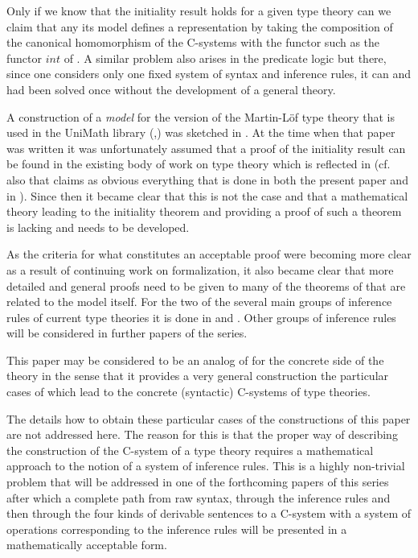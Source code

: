 \documentclass[11pt]{article}
\begin{document}
Only if we know that the initiality result holds for a given type theory can we claim that any its model defines a representation by taking the composition of the canonical homomorphism of the C-systems with the functor such as the functor $int$ of \cite{Cfromauniverse}. A similar problem also arises in the predicate logic but there, since one considers only one fixed system of syntax and inference rules, it can and had been solved once without the development of a general theory. 

A construction of a {\em model} for the version of the Martin-L\"{o}f type theory that is used in the UniMath library (\cite{UniMath},\cite{UniMath2015})  was sketched in \cite{KLV1}. At the time when that paper was written it was unfortunately assumed that a proof of the initiality result can be found in the existing body of work on type theory which is reflected  in \cite[Theorem 1.2.9]{KLV1} (cf. also \cite[Example 1.2.3]{KLV1} that claims as obvious everything that is done in both the present paper and in \cite{Csubsystems}).  Since then it became clear that this is not the case and that a mathematical theory leading to the initiality theorem and providing a proof of such a theorem is lacking and needs to be developed. 

As the criteria for what constitutes an acceptable proof were becoming more clear as a result of continuing work on formalization, it also became clear that more detailed and general proofs need to be given to many of the theorems of \cite{KLV1} that are related to the model itself. For the two of the several main groups of inference rules of current type theories it is done in \cite{fromunivwithPi} and \cite{fromunivwithpaths}. Other groups of inference rules will be considered in further papers of the series. 

This paper may be considered to be an analog of \cite{Cfromauniverse} for the concrete side of the theory in the sense that it provides a very general construction the particular cases of which lead to the concrete (syntactic) C-systems of type theories. 

The details how to obtain these particular cases of the constructions of this paper are not addressed here. The reason for this is that the proper way of describing the construction of the C-system of a type theory requires a mathematical approach to the notion of a system of inference rules. This is a highly non-trivial problem that will be addressed in one of the forthcoming papers of this series after which a complete path from raw syntax, through the inference rules and then through the four kinds of derivable sentences to a C-system with a system of operations corresponding to the inference rules will be presented in a mathematically acceptable form. 
\end{document}
